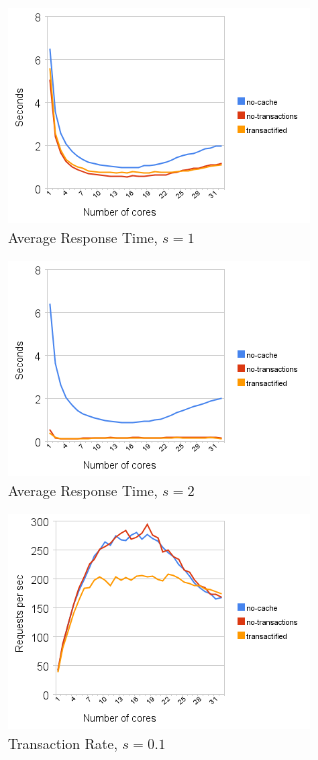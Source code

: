 \documentclass[preprint,natbib,11pt]{sigplanconf}
\begin{document}
\begin{figure}
 \begin{center}
  \includegraphics[width=8cm]{response-time-client-server-1.png}
 \end{center}
 \caption{Average Response Time, $s = 1$}
 \label{fig:response-time-1}
\end{figure}
\begin{figure}
 \begin{center}
  \includegraphics[width=8cm]{response-time-client-server-2.png}
 \end{center}
 \caption{Average Response Time, $s = 2$}
 \label{fig:response-time-2}
\end{figure}
\begin{figure}
 \begin{center}
  \includegraphics[width=8cm]{transaction-rate-client-server-0dot1.png}
 \end{center}
 \caption{Transaction Rate, $s = 0.1$}
 \label{fig:transaction-rate-0.1}
\end{figure}
\end{document}
